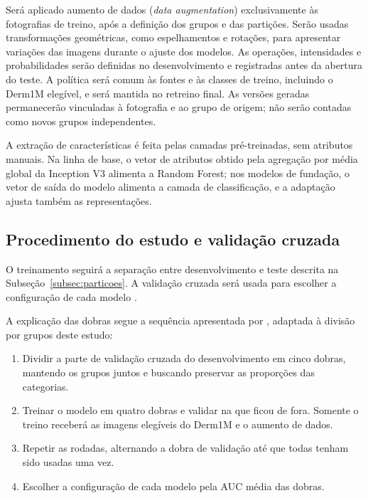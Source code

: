 Será aplicado aumento de dados (\textit{data augmentation}) exclusivamente
às fotografias de treino, após a definição dos grupos e das partições.
Serão usadas transformações geométricas, como espelhamentos e
rotações, para apresentar variações das imagens durante o ajuste dos
modelos. As operações, intensidades e probabilidades serão definidas no
desenvolvimento e registradas antes da abertura do teste. A política será
comum às fontes e às classes de treino, incluindo o Derm1M elegível, e será
mantida no retreino final.
As versões geradas permanecerão vinculadas à fotografia e ao grupo de
origem; não serão contadas como novos grupos independentes.

A extração de características é feita pelas camadas pré-treinadas, sem
atributos manuais. Na linha de base, o vetor de atributos obtido pela
agregação por média global da Inception V3 alimenta a Random Forest;
nos modelos de fundação, o vetor de saída do modelo alimenta a camada de
classificação, e a adaptação ajusta também as representações.

\subsection{Procedimento do estudo e validação cruzada}
\label{subsec:procedimento-validacao}

O treinamento seguirá a separação entre desenvolvimento e teste descrita
na Subseção~\ref{subsec:particoes}. A validação cruzada será usada para
escolher a configuração de cada modelo \cite{raschka2018,varoquaux2023}.

A explicação das dobras segue a sequência apresentada por
, adaptada à divisão por grupos deste estudo:
\begin{enumerate}
	\item Dividir a parte de validação cruzada do desenvolvimento em cinco
	      dobras, mantendo os grupos juntos e buscando preservar as
	      proporções das categorias.
	\item Treinar o modelo em quatro dobras e validar na que ficou de fora.
	      Somente o treino receberá as imagens elegíveis do Derm1M e o
	      aumento de dados.
	\item Repetir as rodadas, alternando a dobra de validação até que todas
	      tenham sido usadas uma vez.
	\item Escolher a configuração de cada modelo pela AUC média das dobras.
\end{enumerate}

